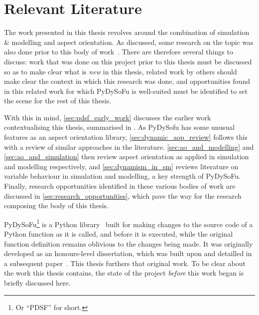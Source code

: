 \chapter{Relevant Literature}

The work presented in this thesis revolves around the combination of simulation
\& modelling and aspect orientation. As discussed, some research on the topic
was also done prior to this body of work~. There are therefore several things to discuss: work that
was done on this project prior to this thesis must be discussed so as to make
clear what is \emph{new} in this thesis, related work by others should make
clear the context in which this research was done, and opportunities found in
this related work for which PyDySoFu is well-suited must be identified to set
the scene for the rest of this thesis.

With this in mind, \cref{sec:pdsf_early_work} discusses the earlier work contextualising this
thesis, summarised in \cite{wallis2018caise}. As PyDySofu has some unusual
features as an aspect orientation library, \cref{sec:dynamic_aop_review} follows
this with a review of similar approaches in the literature.
\cref{sec:ao_and_modelling} and \cref{sec:ao_and_simulation} then review aspect
orientation as applied in simulation and modelling respectively, and
\cref{sec:dynamism_in_sm} reviews literature on variable behaviour in simulation
and modelling, a key strength of PyDySoFu. Finally, research opportunities
identified in these various bodies of work are discussed in
\cref{sec:research_opportunities}, which pave the way for the research composing
the body of this thesis.






PyDySoFu\footnote{Or ``PDSF'' for short.} is a Python library~\cite{pdsf_repo}
built for making changes to the source code of a Python function as it is
called, and before it is executed, while the original function definition
remains oblivious to the changes being made. It was originally developed as an
honours-level dissertation, which was built upon and detailled in a subsequent
paper~\cite{wallis2018caise}. This thesis furthers that original work. To be
clear about the work this thesis contains, the state of the project
\emph{before} this work began is briefly discussed here.

